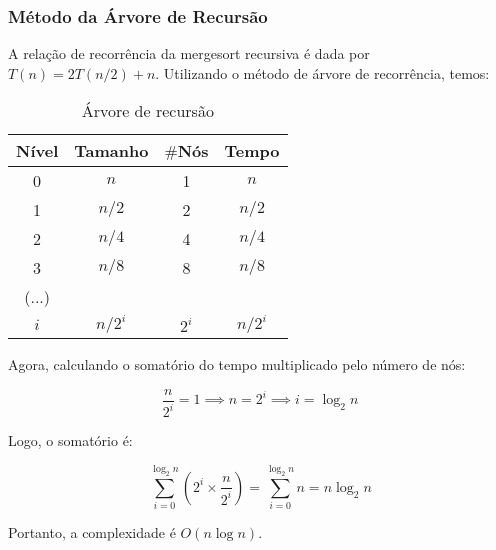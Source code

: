 \subsubsection{Método da Árvore de Recursão}
A relação de recorrência da mergesort recursiva é dada por $T(n) = 2T(n/2) + n$. Utilizando o método de árvore de recorrência, temos:

\begin{table}[ht!]
    \centering
    \begin{tabular}{|c|c|c|c|}
    \hline
    \textbf{Nível} & \textbf{Tamanho} & $\#$\textbf{Nós} & \textbf{Tempo} \\ \hline
     0 & $n$ & 1 & $n$ \\ \hline
     1 & $n/2$ & 2 & $n/2$ \\ \hline
     2 & $n/4$ & 4 & $n/4$ \\ \hline
     3 & $n/8$ & 8 & $n/8$ \\ \hline
     (...) & & & \\ \hline
     $i$ & $n/2^i$ & $2^i$ & $n/2^i$ \\ \hline 
    \end{tabular}  
    \caption{Árvore de recursão}
\end{table}

Agora, calculando o somatório do tempo multiplicado pelo número de nós:

\[
\frac{n}{2^i} = 1 \implies n = 2^i \implies i = \log_2{n}
\]

Logo, o somatório é:

\[
\sum_{i=0}^{\log_2{n}} \left( 2^i \times \frac{n}{2^i} \right) = \sum_{i=0}^{\log_2{n}} n = n \log_2{n}
\]

Portanto, a complexidade é $O(n \log n)$.
